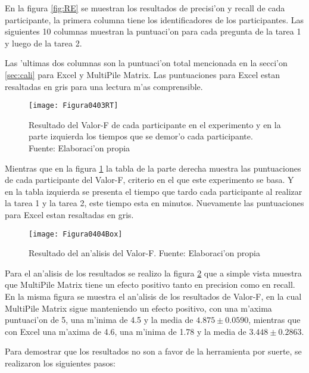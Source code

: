 En la figura \ref{fig:RE} se muestran los resultados de precisi'on y recall de cada participante, la primera columna tiene los identificadores de los participantes. Las siguientes 10 columnas muestran la puntuaci'on para cada pregunta de la tarea 1 y luego de la tarea 2.

Las 'ultimas dos columnas son la puntuaci'on total mencionada en la secci'on \ref{sec:cali} para Excel y MultiPile Matrix. Las puntuaciones para Excel estan resaltadas en gris para una lectura m'as comprensible. 

\begin{figure}[h]
    \centering
    \texttt{[image: Figura0403RT]}
    \caption{Resultado del Valor-F de cada participante en el experimento y en la parte izquierda los tiempos que se demor'o cada participante. Fuente: Elaboraci'on propia}
    \label{fig:RT}
\end{figure}

Mientras que en la figura \ref{fig:RT} la tabla de la parte derecha muestra las puntuaciones de cada participante del Valor-F, criterio en el que este experimento se basa. Y en la tabla izquierda se presenta el tiempo que tardo cada participante al realizar la tarea 1 y la tarea 2, este tiempo esta en minutos. Nuevamente las puntuaciones para Excel estan resaltadas en gris. 

\begin{figure}[h]
    \centering
    \texttt{[image: Figura0404Box]}
    \caption{Resultado del an'alisis del Valor-F. Fuente: Elaboraci'on propia}
    \label{fig:Box}
\end{figure}

Para el an'alisis de los resultados se realizo la figura \ref{fig:Box} que a simple vista muestra que MultiPile Matrix tiene un efecto positivo tanto en precision como en recall. En la misma figura se muestra el an'alisis de los resultados de Valor-F, en la cual MultiPile Matrix sigue manteniendo un efecto positivo, con una m'axima puntuaci'on de 5, una m'inima de 4.5 y la media de $4.875 \pm 0.0590$, mientras que con Excel una m'axima de 4.6, una m'inima de 1.78 y la media de $3.448 \pm 0.2863$. 

Para demostrar que los resultados no son a favor de la herramienta por suerte, se realizaron los siguientes pasos:

